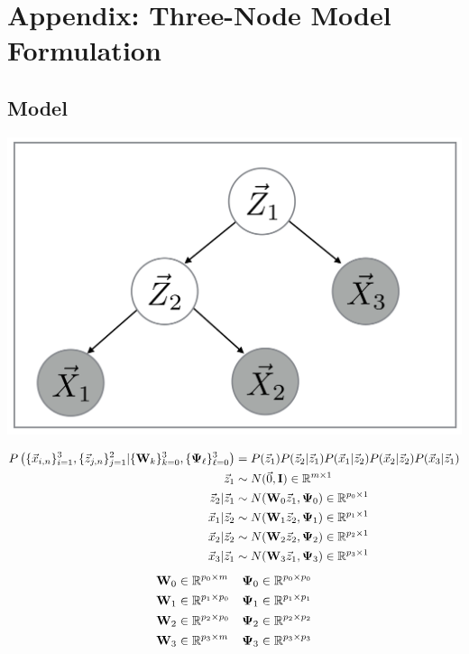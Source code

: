 \chapter{Appendix: Three-Node Model Formulation}
\section{Model}
\begin{center}
\includegraphics[width=\textwidth/3]{MFAA.png}
\end{center}
\newcommand{\fulljointp}{P \left(
  \{\x_{i,n}\}_{i=1}^3,\{ \z_{j,n}\}_{j=1}^2| \{\W_k\}_{k=0}^3,
    \{\bpsi_{\ell}\}_{\ell=0}^3 \right)}
\begin{align*}
  \fulljointp &= P(\z_1) P(\z_2 | \z_1) P(\x_1 | \z_2) P(\x_2 | \z_2)
                P(\x_3 | \z_1) \\
  \z_1 &\sim N(\vec{0}, \I ) \inreala{m}{1} \\
  \z_2| \z_1 &\sim N(\W_0 \z_1, \bpsi_0) \inreala{p_0}{1}\\
  \x_1 | \z_2 &\sim N(\W_1 \z_2, \bpsi_1) \inreala{ p_1}{1}\\
  \x_2 | \z_2 &\sim N(\W_2 \z_2, \bpsi_2) \inreala{p_2}{1} \\
  \x_3 | \z_1 &\sim N(\W_3 \z_1, \bpsi_3) \inreala{p_3}{1}
\end{align*}
\begin{align*}
  \bold{W}_0 &\in \mathbb{R}^{p_0 \times m} &   \bold{\Psi}_0 &\in \mathbb{R}^{p_0 \times p_0} \\
  \bold{W}_1 &\in \mathbb{R}^{p_1 \times p_0} &  \bold{\Psi}_1 &\in \mathbb{R}^{p_1 \times p_1}\\
  \bold{W}_2 &\in \mathbb{R}^{p_2 \times p_0} &   \bold{\Psi}_2 &\in \mathbb{R}^{p_2 \times p_2}\\
  \bold{W}_3 &\in \mathbb{R}^{p_3 \times m} &         \bold{\Psi}_3 &\in \mathbb{R}^{p_3 \times p_3}\\  
\end{align*}


